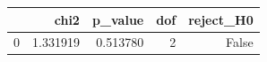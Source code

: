 \begin{tabular}{lrrrr}
\toprule
 & chi2 & p_value & dof & reject_H0 \\
\midrule
0 & 1.331919 & 0.513780 & 2 & False \\
\bottomrule
\end{tabular}
